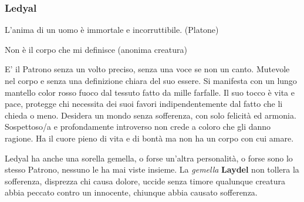 \begin{multicols}{2}
\subsubsection{Ledyal}\label{ledyal}\label{laydel}\hypertarget{ledyal}{} \hypertarget{laydel}{}

\begin{enfasi}{
L'anima di un uomo è immortale e incorruttibile. (Platone)

\medskip

Non è il corpo che mi definisce (anonima creatura)
}\end{enfasi}

E' il Patrono senza un volto preciso, senza una voce se non un canto. Mutevole nel corpo e senza una definizione chiara del suo essere. Si manifesta con un lungo mantello color rosso fuoco dal tessuto fatto da mille farfalle. Il suo tocco è vita e pace, protegge chi necessita dei suoi favori indipendentemente dal fatto che li chieda o meno. Desidera un mondo senza sofferenza, con solo felicità ed armonia. Sospettoso/a e profondamente introverso non crede a coloro che gli danno ragione. Ha il cuore pieno di vita e di bontà ma non ha un corpo con cui amare.

Ledyal ha anche una sorella gemella, o forse un'altra personalità, o forse sono lo stesso Patrono, nessuno le ha mai viste insieme. La \emph{gemella} \textbf{Laydel} non tollera la sofferenza, disprezza chi causa dolore, uccide senza timore qualunque creatura abbia peccato contro un innocente, chiunque abbia causato sofferenza.


\end{multicols}
